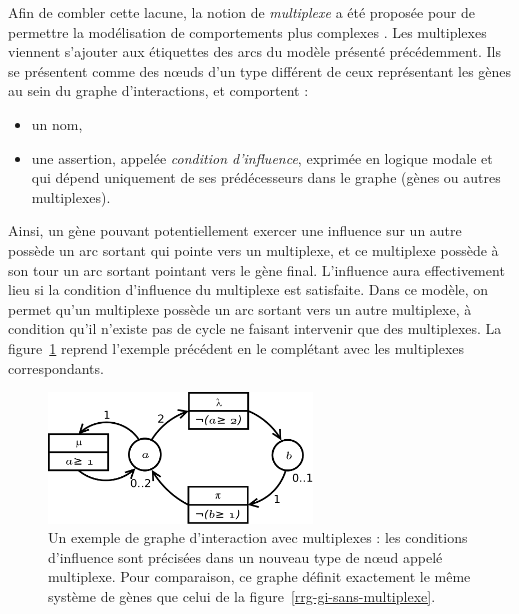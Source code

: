 Afin de combler cette lacune, la notion de \emph{multiplexe} a été proposée pour de permettre la modélisation de comportements plus complexes \cite{bernot-comet-khalis-08, khalis-bernot-comet-richard-roux-siebert-UnPublished}. Les multiplexes viennent s'ajouter aux étiquettes des arcs du modèle présenté précédemment. Ils se présentent comme des n\oe uds d'un type différent de ceux représentant les gènes au sein du graphe d'interactions, et comportent :
\begin{itemize}
  \item un nom,
  \item une assertion, appelée \emph{condition d'influence}, exprimée en logique modale et qui dépend uniquement de ses prédécesseurs dans le graphe (gènes ou autres multiplexes).
\end{itemize}
Ainsi, un gène pouvant potentiellement exercer une influence sur un autre possède un arc sortant qui pointe vers un multiplexe, et ce multiplexe possède à son tour un arc sortant pointant vers le gène final. L'influence aura effectivement lieu si la condition d'influence du multiplexe est satisfaite. Dans ce modèle, on permet qu'un multiplexe possède un arc sortant vers un autre multiplexe, à condition qu'il n'existe pas de cycle ne faisant intervenir que des multiplexes. La figure~\ref{rrg-gi-avec-multiplexe} reprend l'exemple précédent en le complétant avec les multiplexes correspondants.

\begin{figure}[ht]
  \centering\includegraphics[width=7cm]{figs/gi-avec-multiplexe}
  \caption{Un exemple de graphe d'interaction avec multiplexes : les conditions d'influence sont précisées dans un nouveau type de n\oe ud appelé multiplexe. Pour comparaison, ce graphe définit exactement le même système de gènes que celui de la figure~\ref{rrg-gi-sans-multiplexe}.}
  \label{rrg-gi-avec-multiplexe}
\end{figure}

